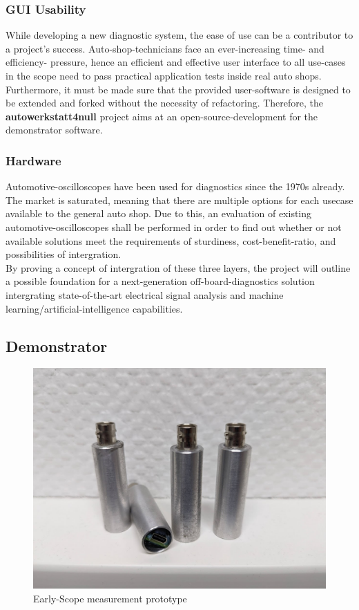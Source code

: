 \subsubsection{GUI Usability}
While developing a new diagnostic system, the ease of use can be a contributor to a project's success.
Auto-shop-technicians face an ever-increasing time- and efficiency- pressure, hence an efficient and effective user interface to all use-cases in the scope need to pass practical application tests inside real auto shops.
Furthermore, it must be made sure that the provided user-software is designed to be extended and forked without the necessity of refactoring.
Therefore, the \textbf{autowerkstatt4null} project aims at an open-source-development for the demonstrator software.

\subsubsection{Hardware}
Automotive-oscilloscopes have been used for diagnostics since the 1970s already.
The market is saturated, meaning that there are multiple options for each usecase available to the general auto shop.
Due to this, an evaluation of existing automotive-oscilloscopes shall be performed in order to find out whether or not available solutions meet the requirements of sturdiness, cost-benefit-ratio, and possibilities of intergration. \\

By proving a concept of intergration of these three layers, the project will outline a possible foundation for a next-generation off-board-diagnostics solution intergrating state-of-the-art electrical signal analysis and machine learning/artificial-intelligence capabilities.


\subsection{Demonstrator}
\begin{figure}[ht]
  \centering
  \includegraphics[width=0.8\linewidth]{figures/early_prototype.jpg}
  \caption{Early-Scope measurement prototype}
  \label{fig:early-scope}
\end{figure}

